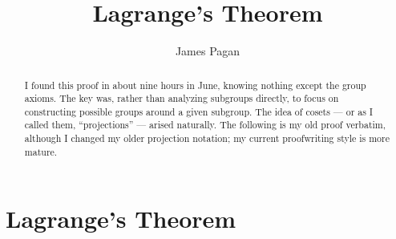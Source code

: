 \documentclass[11pt]{article}
\title{Lagrange's Theorem}
\author{James Pagan}
\date{}
\begin{document}
\maketitle

\begin{abstract}
	I found this proof in about nine hours in June, knowing nothing except the group axioms. The key was, rather than analyzing subgroups directly, to focus on constructing possible groups around a given subgroup. The idea of cosets --- or as I called them, ``projections'' --- arised naturally. The following is my old proof verbatim, although I changed my older projection notation; my current proofwriting style is more mature.
\end{abstract}




\section{Lagrange's Theorem}
\end{document}
